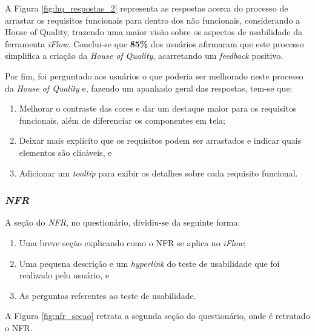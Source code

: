A Figura \ref{fig:hq_respostas_2} representa as respostas acerca do processo de arrastar os requisitos funcionais para dentro dos não funcionais, considerando a House of Quality, trazendo uma maior visão sobre os aspectos de usabilidade da ferramenta \textit{iFlow}. Conclui-se que \textbf{85\%} dos usuários afirmaram que este processo simplifica a criação da \textit{House of Quality}, acarretando um \textit{feedback} positivo.

Por fim, foi perguntado aos usuários o que poderia ser melhorado neste processo da \textit{House of Quality} e, fazendo um apanhado geral das respostas, tem-se que:

\begin{enumerate}
    \item Melhorar o contraste das cores e dar um destaque maior para os requisitos funcionais, além de diferenciar os componentes em tela;
    \item Deixar mais explícito que os requisitos podem ser arrastados e indicar quais elementos são clicáveis, e
    \item Adicionar um \textit{tooltip} para exibir os detalhes sobre cada requisito funcional.
\end{enumerate}


\subsubsection{\textit{NFR}}
A seção do \textit{NFR}, no questionário, dividiu-se da seguinte forma:

\begin{enumerate}
    \item Uma breve seção explicando como o NFR se aplica no \textit{iFlow};
    \item Uma pequena descrição e um \textit{hyperlink} do teste de usabilidade que foi realizado pelo usuário, e
    \item As perguntas referentes ao teste de usabilidade.
\end{enumerate}

A Figura \ref{fig:nfr_secao} retrata a segunda seção do questionário, onde é retratado o NFR.

